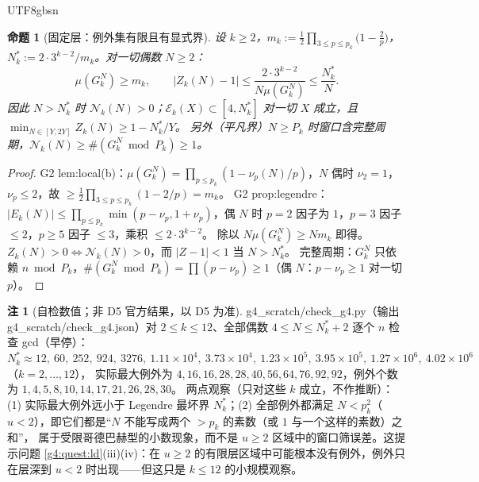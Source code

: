 \documentclass[11pt,a4paper]{article}
\newcommand{\Haar}{\mu}
\newcommand{\status}[1]{\par\noindent\fbox{\textbf{状态：#1}}\par\smallskip}
\newcommand{\Cnt}{\mathcal N}          %
\newcommand{\Exc}{\mathcal E}          %
\theoremstyle{plain}
\newtheorem{prop}{命题}
\theoremstyle{definition}
\newtheorem{rem}[lem]{注}
\begin{document}
\begin{CJK}{UTF8}{gbsn}
\begin{prop}[固定层：例外集有限且有显式界]\label{g4:prop:fixedk}
设 $k\ge2$，$m_k:=\frac12\prod_{3\le p\le p_k}\bigl(1-\frac2p\bigr)$，$N_k^*:=2\cdot3^{k-2}/m_k$。对一切偶数 $N\ge2$：
\[
\Haar(G_k^N)\ge m_k,\qquad |Z_k(N)-1|\le\frac{2\cdot3^{k-2}}{N\Haar(G_k^N)}\le\frac{N_k^*}{N}.
\]
因此 $N>N_k^*$ 时 $\Cnt_k(N)>0$；$\Exc_k(X)\subset[4,N_k^*]$ 对一切 $X$ 成立，且 $\min_{N\in[Y,2Y]}Z_k(N)\ge1-N_k^*/Y$。
另外（平凡界）$N\ge P_k$ 时窗口含完整周期，$\Cnt_k(N)\ge\#(G_k^N\bmod P_k)\ge1$。
\end{prop}
\status{已证（框架内）}
\begin{proof}
G2 lem:local(b)：$\Haar(G_k^N)=\prod_{p\le p_k}(1-\nu_p(N)/p)$，$N$ 偶时 $\nu_2=1$，$\nu_p\le2$，故 $\ge\frac12\prod_{3\le p\le p_k}(1-2/p)=m_k$。
G2 prop:legendre：$|E_k(N)|\le\prod_{p\le p_k}\min(p-\nu_p,1+\nu_p)$，偶 $N$ 时 $p=2$ 因子为 $1$，$p=3$ 因子 $\le2$，$p\ge5$ 因子 $\le3$，乘积 $\le2\cdot3^{k-2}$。
除以 $N\Haar(G_k^N)\ge Nm_k$ 即得。$Z_k(N)>0\iff\Cnt_k(N)>0$，而 $|Z-1|<1$ 当 $N>N_k^*$。
完整周期：$G_k^N$ 只依赖 $n\bmod P_k$，$\#(G_k^N\bmod P_k)=\prod(p-\nu_p)\ge1$（偶 $N$：$p-\nu_p\ge1$ 对一切 $p$）。
\end{proof}

\begin{rem}[自检数值；非 D5 官方结果，以 D5 为准]\label{g4:rem:scratch}
g4\_scratch/check\_g4.py（输出 g4\_scratch/check\_g4.json）对 $2\le k\le12$、全部偶数 $4\le N\le N_k^*+2$ 逐个 $n$ 检查 gcd（早停）：
$N_k^*\approx12,\ 60,\ 252,\ 924,\ 3276,\ 1.11\times10^4,\ 3.73\times10^4,\ 1.23\times10^5,\ 3.95\times10^5,\ 1.27\times10^6,\ 4.02\times10^6$（$k=2,\dots,12$），
实际最大例外为 $4,16,16,28,28,40,56,64,76,92,92$，例外个数为 $1,4,5,8,10,14,17,21,26,28,30$。
两点观察（只对这些 $k$ 成立，不作推断）：(1) 实际最大例外远小于 Legendre 最坏界 $N_k^*$；(2) 全部例外都满足 $N<p_k^2$（$u<2$），即它们都是“$N$ 不能写成两个 $>p_k$ 的素数（或 $1$ 与一个这样的素数）之和”，
属于受限哥德巴赫型的小数现象，而不是 $u\ge2$ 区域中的窗口筛误差。这提示问题 \ref{g4:quest:ld}(iii)(iv)：在 $u\ge2$ 的有限层区域中可能根本没有例外，例外只在层深到 $u<2$ 时出现——但这只是 $k\le12$ 的小规模观察。
\end{rem}


\end{CJK}
\end{document}
